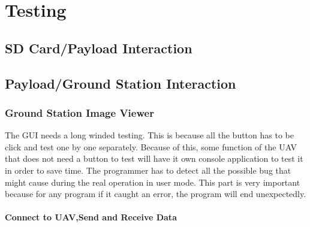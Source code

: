 \chapter{Testing}



\section{SD Card/Payload Interaction}

\section{Payload/Ground Station Interaction}

\subsection{Ground Station Image Viewer}
The GUI needs a long winded testing. This is because all the button has to be click and test one by one separately. Because of this, some function of the UAV that does not need a button to test will have it own console application to test it in order to save time. The programmer has to detect all the possible bug that might cause during the real operation in user mode. This part is very important because for any program if it caught an error, the program will end unexpectedly.
\subsubsection*{Connect to UAV,Send and Receive Data}


